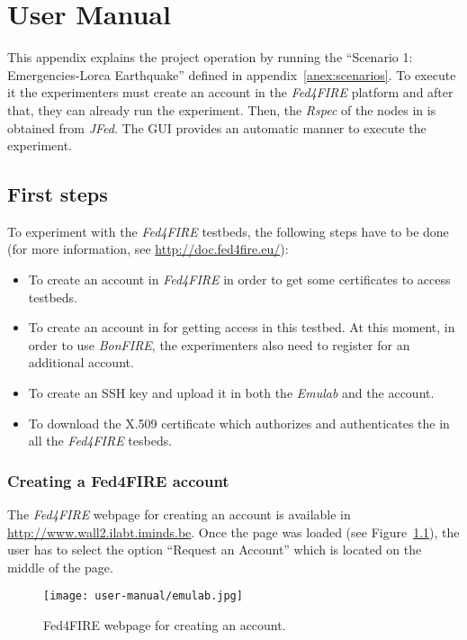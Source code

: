 \chapter{User Manual}

This appendix explains the project operation by running the ``Scenario 1:
Emergencies-Lorca Earthquake'' defined in appendix~\ref{anex:scenarios}. To
execute it the experimenters must create an account in the \emph{Fed4FIRE} platform
and after that, they can already run the experiment. Then, the \emph{Rspec} of the nodes in
\vw is obtained from \emph{JFed}. The \ac{GUI} provides an
automatic manner to execute the experiment.

\section{First steps}
\label{sec:first-steps}
To experiment with the \emph{Fed4FIRE} testbeds, the following steps have to be
done (for more information, see \url{http://doc.fed4fire.eu/}): 
\begin{itemize}
\item To create an account in \emph{Fed4FIRE} in order to get some certificates
  to access testbeds.
\item To create an account in \bonfire for getting access in this testbed. At
  this moment, in order to use \emph{BonFIRE}, the experimenters also need to register for an additional account. 
\item To create an \ac{SSH} key and upload it in both the \emph{Emulab} and the
  \bonfire account.
\item To download the X.509 certificate which authorizes and authenticates the
  in all the \emph{Fed4FIRE} tesbeds.
\end{itemize}

\subsection{Creating a Fed4FIRE account}

The \emph{Fed4FIRE} webpage for creating an account is available in
\url{http://www.wall2.ilabt.iminds.be}. Once the page was loaded (see Figure~\ref{fig:fed4fire-account}), the user has
to select the option ``Request an Account'' which is located on the middle of the page.

\begin{figure}[!h]
\begin{center}
\texttt{[image: user-manual/emulab.jpg]}
\caption{Fed4FIRE webpage for creating an account.}
\label{fig:fed4fire-account}
\end{center}
\end{figure}

